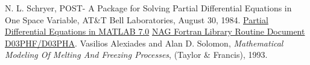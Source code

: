 \documentclass{article}
\begin{document}
\begin{thebibliography}{99}
 N. L. Schryer, POST- A Package for Solving Partial
Differential Equations in One Space Variable, AT\&T Bell Laboratories,
August 30, 1984.
\href{https://www.math.tamu.edu/~phoward/m401/pdemat.pdf}
{Partial Differential Equations in MATLAB 7.0}
\href{https://www.nag.co.uk/numeric/fl/manual/pdf/D03/d03phf.pdf}
{NAG Fortran Library Routine Document D03PHF/D03PHA}.
 Vasilios Alexiades and  Alan D. Solomon,
 {\it Mathematical Modeling Of Melting And Freezing Processes},
 (Taylor \& Francis), 1993.
\end{thebibliography}
\end{document}

